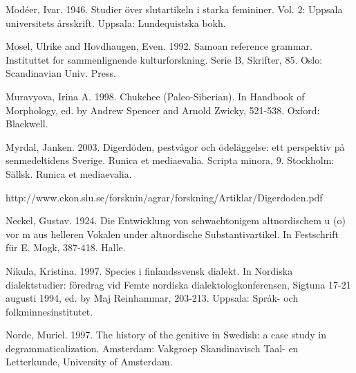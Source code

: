 \begin{styleBodytextC}
Modéer, Ivar. 1946. Studier över slutartikeln i starka femininer. Vol. 2: Uppsala universitets årsskrift. Uppsala: Lundequistska bokh.

\end{styleBodytextC}

\begin{styleBodytextC}
Mosel, Ulrike and Hovdhaugen, Even. 1992. Samoan reference grammar. Instituttet for sammenlignende kulturforskning. Serie B, Skrifter, 85. Oslo: Scandinavian Univ. Press.

\end{styleBodytextC}

\begin{styleBodytextC}
Muravyova, Irina A. 1998. Chukchee (Paleo-Siberian). In Handbook of Morphology, ed. by Andrew Spencer and Arnold Zwicky, 521-538. Oxford: Blackwell.

\end{styleBodytextC}

\begin{styleBodytextC}
Myrdal, Janken. 2003. Digerdöden, pestvågor och ödeläggelse: ett perspektiv på senmedeltidens Sverige. Runica et mediaevalia. Scripta minora, 9. Stockholm: Sällsk. Runica et mediaevalia. 

\end{styleBodytextC}

\begin{styleBodytextC}
http://www.ekon.slu.se/forsknin/agrar/forskning/Artiklar/Digerdoden.pdf 

\end{styleBodytextC}

\begin{styleBodytextC}
Neckel, Gustav. 1924. Die Entwicklung von schwachtonigem altnordischem u (o) vor m aus helleren Vokalen under altnordische Substantivartikel. In Festschrift für E. Mogk, 387-418. Halle.

\end{styleBodytextC}

\begin{styleBodytextC}
Nikula, Kristina. 1997. Species i finlandssvensk dialekt. In Nordiska dialektstudier: föredrag vid Femte nordiska dialektologkonferensen, Sigtuna 17-21 augusti 1994, ed. by Maj Reinhammar, 203-213. Uppsala: Språk- och folkminnesinstitutet.

\end{styleBodytextC}

\begin{styleBodytextC}
Norde, Muriel. 1997. The history of the genitive in Swedish: a case study in degrammaticalization. Amsterdam: Vakgroep Skandinavisch Taal- en Letterkunde, University of Amsterdam.

\end{styleBodytextC}

